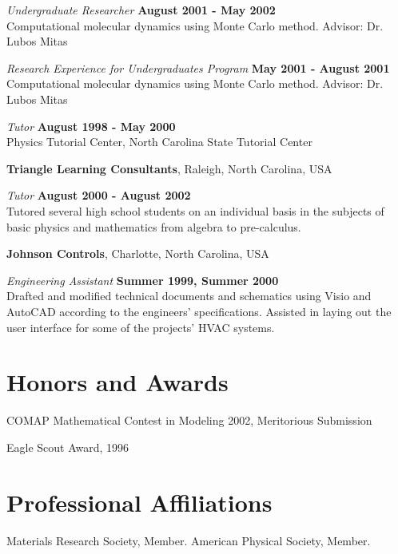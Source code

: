 \documentclass[letterpaper,margin,line]{res}
\begin{document}
\begin{resume}
{\em Undergraduate Researcher} \hfill {\bf August 2001 - May 2002}\\
Computational molecular dynamics using Monte Carlo method. Advisor: Dr. Lubos Mitas

{\em Research Experience for Undergraduates Program} \hfill {\bf May 2001 - August 2001}\\
Computational molecular dynamics using Monte Carlo method. Advisor: Dr. Lubos Mitas

{\em Tutor} \hfill {\bf August 1998 - May 2000}\\
Physics Tutorial Center, North Carolina State Tutorial Center

{\bf Triangle Learning Consultants}, Raleigh, North Carolina, USA

\vspace{-.3cm}
{\em Tutor} \hfill {\bf August 2000 - August 2002}\\
Tutored several high school students on an individual basis in the subjects of basic physics and mathematics from algebra to pre-calculus.



{\bf Johnson Controls}, Charlotte, North Carolina, USA

\vspace{-.3cm}
{\em Engineering Assistant} \hfill {\bf Summer 1999, Summer 2000}\\
Drafted and modified technical documents and schematics using Visio and AutoCAD according to the engineers' specifications. Assisted in laying out the user interface for some of the projects' HVAC systems.


\section{\sc Honors and Awards} 
COMAP Mathematical Contest in Modeling 2002, Meritorious Submission

\vspace*{-2.5mm}
Eagle Scout Award, 1996


\section{\sc Professional Affiliations} 
Materials Research Society, Member.
American Physical Society, Member.


\end{resume}
\end{document}
